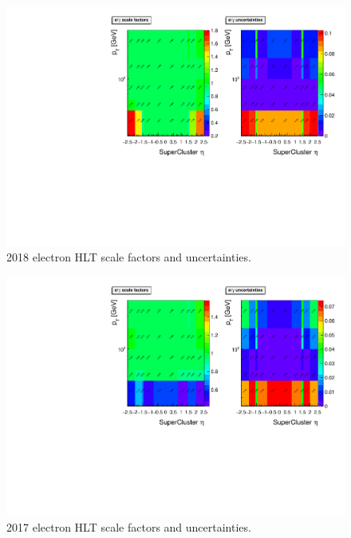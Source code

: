 \begin{figure}[htb!]
	\centering
	\includegraphics[width=0.85\linewidth]{figs/05_analysis/UL2018_SF2D_myWP.pdf}
	\caption[2018 electron HLT scale factors and uncertainties.]{2018 electron HLT scale factors and uncertainties.}
	\label{fig:UL2018_SF2D}
\end{figure}

\begin{figure}[htb!]
	\centering
	\includegraphics[width=0.85\linewidth]{figs/05_analysis/UL2017_SF2D_myWP.pdf}
	\caption[2017 electron HLT scale factors and uncertainties.]{2017 electron HLT scale factors and uncertainties.}
	\label{fig:UL2017_SF2D}
\end{figure}

